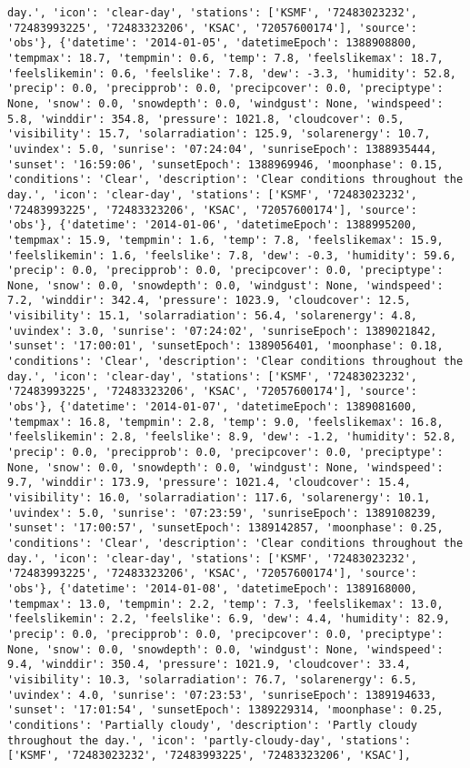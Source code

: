 \documentclass[
  letterpaper,
  DIV=11,
  numbers=noendperiod]{scrartcl}
\begin{document}
\begin{verbatim}
day.', 'icon': 'clear-day', 'stations': ['KSMF', '72483023232', '72483993225', '72483323206', 'KSAC', '72057600174'], 'source': 'obs'}, {'datetime': '2014-01-05', 'datetimeEpoch': 1388908800, 'tempmax': 18.7, 'tempmin': 0.6, 'temp': 7.8, 'feelslikemax': 18.7, 'feelslikemin': 0.6, 'feelslike': 7.8, 'dew': -3.3, 'humidity': 52.8, 'precip': 0.0, 'precipprob': 0.0, 'precipcover': 0.0, 'preciptype': None, 'snow': 0.0, 'snowdepth': 0.0, 'windgust': None, 'windspeed': 5.8, 'winddir': 354.8, 'pressure': 1021.8, 'cloudcover': 0.5, 'visibility': 15.7, 'solarradiation': 125.9, 'solarenergy': 10.7, 'uvindex': 5.0, 'sunrise': '07:24:04', 'sunriseEpoch': 1388935444, 'sunset': '16:59:06', 'sunsetEpoch': 1388969946, 'moonphase': 0.15, 'conditions': 'Clear', 'description': 'Clear conditions throughout the day.', 'icon': 'clear-day', 'stations': ['KSMF', '72483023232', '72483993225', '72483323206', 'KSAC', '72057600174'], 'source': 'obs'}, {'datetime': '2014-01-06', 'datetimeEpoch': 1388995200, 'tempmax': 15.9, 'tempmin': 1.6, 'temp': 7.8, 'feelslikemax': 15.9, 'feelslikemin': 1.6, 'feelslike': 7.8, 'dew': -0.3, 'humidity': 59.6, 'precip': 0.0, 'precipprob': 0.0, 'precipcover': 0.0, 'preciptype': None, 'snow': 0.0, 'snowdepth': 0.0, 'windgust': None, 'windspeed': 7.2, 'winddir': 342.4, 'pressure': 1023.9, 'cloudcover': 12.5, 'visibility': 15.1, 'solarradiation': 56.4, 'solarenergy': 4.8, 'uvindex': 3.0, 'sunrise': '07:24:02', 'sunriseEpoch': 1389021842, 'sunset': '17:00:01', 'sunsetEpoch': 1389056401, 'moonphase': 0.18, 'conditions': 'Clear', 'description': 'Clear conditions throughout the day.', 'icon': 'clear-day', 'stations': ['KSMF', '72483023232', '72483993225', '72483323206', 'KSAC', '72057600174'], 'source': 'obs'}, {'datetime': '2014-01-07', 'datetimeEpoch': 1389081600, 'tempmax': 16.8, 'tempmin': 2.8, 'temp': 9.0, 'feelslikemax': 16.8, 'feelslikemin': 2.8, 'feelslike': 8.9, 'dew': -1.2, 'humidity': 52.8, 'precip': 0.0, 'precipprob': 0.0, 'precipcover': 0.0, 'preciptype': None, 'snow': 0.0, 'snowdepth': 0.0, 'windgust': None, 'windspeed': 9.7, 'winddir': 173.9, 'pressure': 1021.4, 'cloudcover': 15.4, 'visibility': 16.0, 'solarradiation': 117.6, 'solarenergy': 10.1, 'uvindex': 5.0, 'sunrise': '07:23:59', 'sunriseEpoch': 1389108239, 'sunset': '17:00:57', 'sunsetEpoch': 1389142857, 'moonphase': 0.25, 'conditions': 'Clear', 'description': 'Clear conditions throughout the day.', 'icon': 'clear-day', 'stations': ['KSMF', '72483023232', '72483993225', '72483323206', 'KSAC', '72057600174'], 'source': 'obs'}, {'datetime': '2014-01-08', 'datetimeEpoch': 1389168000, 'tempmax': 13.0, 'tempmin': 2.2, 'temp': 7.3, 'feelslikemax': 13.0, 'feelslikemin': 2.2, 'feelslike': 6.9, 'dew': 4.4, 'humidity': 82.9, 'precip': 0.0, 'precipprob': 0.0, 'precipcover': 0.0, 'preciptype': None, 'snow': 0.0, 'snowdepth': 0.0, 'windgust': None, 'windspeed': 9.4, 'winddir': 350.4, 'pressure': 1021.9, 'cloudcover': 33.4, 'visibility': 10.3, 'solarradiation': 76.7, 'solarenergy': 6.5, 'uvindex': 4.0, 'sunrise': '07:23:53', 'sunriseEpoch': 1389194633, 'sunset': '17:01:54', 'sunsetEpoch': 1389229314, 'moonphase': 0.25, 'conditions': 'Partially cloudy', 'description': 'Partly cloudy throughout the day.', 'icon': 'partly-cloudy-day', 'stations': ['KSMF', '72483023232', '72483993225', '72483323206', 'KSAC'], 
\end{verbatim}
\end{document}
